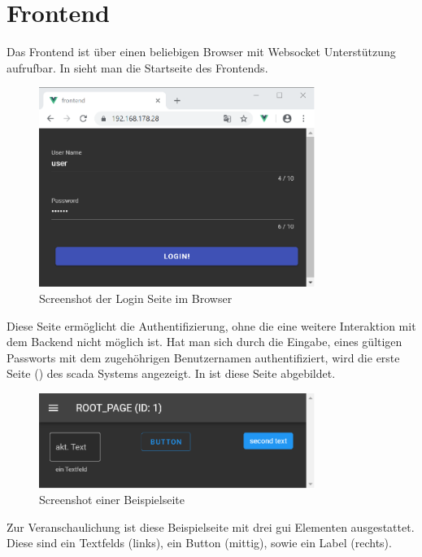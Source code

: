 \section{Frontend}\label{sec:poc:frontend}
Das Frontend ist über einen beliebigen Browser mit Websocket Unterstützung aufrufbar.
In  sieht man die Startseite des Frontends.
\begin{figure}[H]
  \centering
  \includegraphics[width=0.8\textwidth]{content/hauptteil/umsetzungPoC/frontend/res/login.pdf}
  \caption{Screenshot der Login Seite im Browser}
  \label{fig:frontend:poc:login}
\end{figure}
Diese Seite ermöglicht die Authentifizierung, ohne die eine weitere Interaktion mit dem Backend nicht möglich ist.
Hat man sich durch die Eingabe, eines gültigen Passworts mit dem zugehöhrigen Benutzernamen authentifiziert, 
wird die erste Seite () des \ac{scada} Systems angezeigt. In  ist diese Seite abgebildet.
\begin{figure}[ht]
  \centering
  \includegraphics[width=0.8\textwidth]{content/hauptteil/umsetzungPoC/frontend/res/page.pdf}
  \caption{Screenshot einer Beispielseite}
  \label{fig:frontend:poc:page}
\end{figure}
Zur Veranschaulichung ist diese Beispielseite mit drei \ac{gui} Elementen ausgestattet. 
Diese sind ein Textfelds (links), ein Button (mittig), sowie ein Label (rechts).
